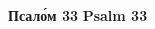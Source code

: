 \documentclass[twoside]{article}
\newcommand{\LITTITLE}[1]{\textbf{#1}} %
\begin{document}
\begin{paracol}{2}
\clearpage
{\Large
\begin{paracol}{2}
{
\LITTITLE{Псал\'{о}м 33}
}
\switchcolumn
\LITTITLE{Psalm 33}
\end{paracol}
}
\begin{comment}
\begin{paracol}{2}
Благословл\'{ю} Г\'{о}спода на вс\'{я}кое вр\'{е}мя,/ в\'{ы}ну хвал\'{а} Ег\'{о} во уст\'{е}х мо\'{и}х.\\
О Г\'{о}споде похв\'{а}лится душ\'{а} мо\'{я},/ да усл\'{ы}шат кр\'{о}тцыи, и возвесел\'{я}тся.\\
Возвел\'{и}чите Г\'{о}спода со мн\'{о}ю,/ и вознес\'{е}м \'{И}мя Ег\'{о} вк\'{у}пе.\\
Взыск\'{а}х Г\'{о}спода, и усл\'{ы}ша мя,/ и от вс\'{е}х скорб\'{е}й мо\'{и}х изб\'{а}ви мя.\\
Приступ\'{и}те к Нем\'{у}, и просвет\'{и}теся,/ и л\'{и}ца в\'{а}ша не посты\-д\'{я}тся.\\
Сей н\'{и}щий воззв\'{а}, и Госп\'{о}дь усл\'{ы}ша и,/ и от вс\'{е}х скорб\'{е}й ег\'{о} спас\'{е} и.\\
Ополч\'{и}тся \'{а}нгел Госп\'{о}день \'{о}крест бо\'{я}щихся Ег\'{о},/ и из\-б\'{а}вит их./ Вкус\'{и}те и в\'{и}дите, \'{я}ко благ Госп\'{о}дь:\\
блаж\'{е}н муж, \'{и}же упов\'{а}ет Нань./ Б\'{о}йтеся Г\'{о}спода, вс\'{и} свят\'{и}и Ег\'{о},\\
\'{я}ко несть лиш\'{е}ния бо\'{я}щимся Ег\'{о}./ Бог\'{а}тии обнищ\'{а}ша и взалк\'{а}ша:\\
взыск\'{а}ющии же Г\'{о}спода не лиш\'{а}тся вс\'{я}каго бл\'{а}га./ Прии\-д\'{и}те, ч\'{а}да, посл\'{у}шайте мен\'{е},\\
стр\'{а}ху Госп\'{о}дню науч\'{у} вас./ Кт\'{о} есть челов\'{е}к хот\'{я}й жив\'{о}т,\\
люб\'{я}й дни в\'{и}дети бл\'{а}ги?/ Удерж\'{и} яз\'{ы}к твой от зла,\\
и устн\'{е} тво\'{и}, \'{е}же не глаг\'{о}лати льсти./ Уклон\'{и}ся от зла и сотвор\'{и} бл\'{а}го.\\
Взыщ\'{и} м\'{и}ра, и пожен\'{и} \'{и}./ \'{О}чи Госп\'{о}дни на пр\'{а}ведныя,\\
и \'{у}ши Ег\'{о} в мол\'{и}тву их./ Лиц\'{е} же Госп\'{о}дне на твор\'{я}щия зл\'{а}я,\\
\'{е}же потреб\'{и}ти от земл\'{и} п\'{а}мять их./ Воззв\'{а}ша пр\'{а}веднии, и Госп\'{о}дь усл\'{ы}ша их,\\

\end{comment}
\end{paracol}
\end{document}

